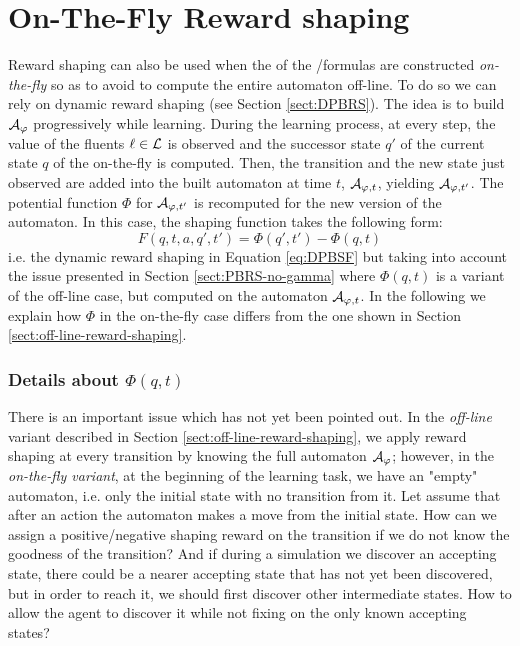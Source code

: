 \section{On-The-Fly Reward shaping}\label{sect:on-the-fly-reward-shaping}
Reward shaping can also be used when the \DFAs of the \LTLf /\LDLf formulas are constructed \emph{on-the-fly} \citep{AAAI1817342} so as to avoid to compute the entire automaton off-line. To do so we can rely on dynamic reward shaping (see Section \ref{sect:DPBRS}).
The idea is to build $\mathcal{A}_{\varphi}$ progressively while learning. During the learning process, at every step, the value of the fluents $\ell \in \mathcal{L}$ is observed and the successor state $q'$ of the current state $q$ of the \DFA on-the-fly is computed. 
Then, the transition and the new state just observed are added into the built automaton at time $t$, $\mathcal{A}_{\varphi, t}$, yielding $\mathcal{A}_{\varphi, t'}$. The potential function $\Phi$ for $\mathcal{A}_{\varphi, t'}$ is recomputed for the new version of the automaton. In this case, the shaping function takes the following form: 
\begin{equation}
F(q, t, a, q', t') = \Phi(q', t') - \Phi(q, t)
\end{equation}
i.e. the dynamic reward shaping in Equation \ref{eq:DPBSF} but taking into account the issue presented in Section \ref{sect:PBRS-no-gamma}
where $\Phi(q, t)$ is a variant of the off-line case, but computed on the automaton $\mathcal{A}_{\varphi, t}$. In the following we explain how $\Phi$ in the on-the-fly case differs from the one shown in Section \ref{sect:off-line-reward-shaping}.

\subsubsection{Details about $\Phi(q, t)$}
There is an important issue which has not yet been pointed out. In the \emph{off-line} variant described in Section \ref{sect:off-line-reward-shaping}, we apply reward shaping at every transition by knowing the full automaton $\mathcal{A}_\varphi$; however, in the \emph{on-the-fly variant}, at the beginning of the learning task, we have an "empty" automaton, i.e. only the initial state with no transition from it. 
Let assume that after an action the automaton makes a move from the initial state. How can we assign a positive/negative shaping reward on the transition if we do not know the goodness of the transition?
And if during a simulation we discover an accepting state, there could be a nearer accepting state that has not yet been discovered, but in order to reach it, we should first discover other intermediate states. How to allow the agent to discover it while not fixing on the only known accepting states?

